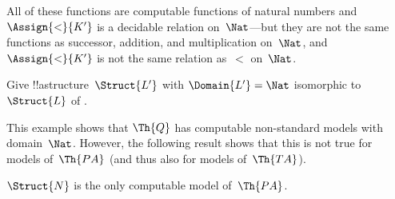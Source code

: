 \documentclass[../../../include/open-logic-section]{subfiles}
\begin{document}
\begin{ex}
All of these functions are computable functions of natural numbers and
$\Assign{<}{K'}$ is a decidable relation on~$\Nat$---but they are not
the same functions as successor, addition, and multiplication
on~$\Nat$, and $\Assign{<}{K'}$ is not the same relation as~$<$
on~$\Nat$.
\end{ex}

\begin{prob}
Give !!a{structure}~$\Struct{L'}$ with $\Domain{L'} = \Nat$ isomorphic
to~$\Struct{L}$ of .
\end{prob}

\begin{explain}
This example shows that $\Th{Q}$ has computable non-standard models
with domain~$\Nat$.  However, the following result shows that this is
not true for models of~$\Th{PA}$ (and thus also for models
of~$\Th{TA}$).
\end{explain}

\begin{thm}
$\Struct{N}$ is the only computable model of~$\Th{PA}$.
\end{thm}
  
\end{document}
